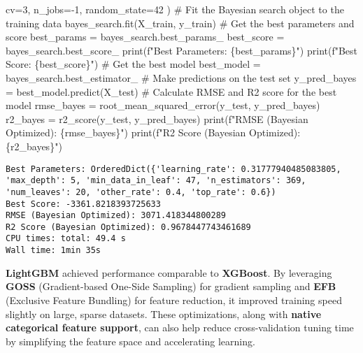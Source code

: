 \documentclass[
  letterpaper,
  DIV=11,
  numbers=noendperiod]{scrreprt}
\newenvironment{Shaded}{\begin{snugshade}}{\end{snugshade}}
\newcommand{\BuiltInTok}[1]{\textcolor[rgb]{0.00,0.23,0.31}{#1}}
\newcommand{\CommentTok}[1]{\textcolor[rgb]{0.37,0.37,0.37}{#1}}
\newcommand{\DecValTok}[1]{\textcolor[rgb]{0.68,0.00,0.00}{#1}}
\newcommand{\NormalTok}[1]{\textcolor[rgb]{0.00,0.23,0.31}{#1}}
\newcommand{\OperatorTok}[1]{\textcolor[rgb]{0.37,0.37,0.37}{#1}}
\newcommand{\SpecialCharTok}[1]{\textcolor[rgb]{0.37,0.37,0.37}{#1}}
\newcommand{\SpecialStringTok}[1]{\textcolor[rgb]{0.13,0.47,0.30}{#1}}
\begin{document}
\begin{Shaded}
\begin{Highlighting}[]
\NormalTok{    cv}\OperatorTok{=}\DecValTok{3}\NormalTok{,}
\NormalTok{    n\_jobs}\OperatorTok{={-}}\DecValTok{1}\NormalTok{,}
\NormalTok{    random\_state}\OperatorTok{=}\DecValTok{42}
\NormalTok{)}
\CommentTok{\# Fit the Bayesian search object to the training data}
\NormalTok{bayes\_search.fit(X\_train, y\_train)}
\CommentTok{\# Get the best parameters and score}
\NormalTok{best\_params }\OperatorTok{=}\NormalTok{ bayes\_search.best\_params\_}
\NormalTok{best\_score }\OperatorTok{=}\NormalTok{ bayes\_search.best\_score\_}
\BuiltInTok{print}\NormalTok{(}\SpecialStringTok{f"Best Parameters: }\SpecialCharTok{\{}\NormalTok{best\_params}\SpecialCharTok{\}}\SpecialStringTok{"}\NormalTok{)}
\BuiltInTok{print}\NormalTok{(}\SpecialStringTok{f"Best Score: }\SpecialCharTok{\{}\NormalTok{best\_score}\SpecialCharTok{\}}\SpecialStringTok{"}\NormalTok{)}
\CommentTok{\# Get the best model}
\NormalTok{best\_model }\OperatorTok{=}\NormalTok{ bayes\_search.best\_estimator\_}
\CommentTok{\# Make predictions on the test set}
\NormalTok{y\_pred\_bayes }\OperatorTok{=}\NormalTok{ best\_model.predict(X\_test)}
\CommentTok{\# Calculate RMSE and R2 score for the best model}
\NormalTok{rmse\_bayes }\OperatorTok{=}\NormalTok{ root\_mean\_squared\_error(y\_test, y\_pred\_bayes)}
\NormalTok{r2\_bayes }\OperatorTok{=}\NormalTok{ r2\_score(y\_test, y\_pred\_bayes)}
\BuiltInTok{print}\NormalTok{(}\SpecialStringTok{f"RMSE (Bayesian Optimized): }\SpecialCharTok{\{}\NormalTok{rmse\_bayes}\SpecialCharTok{\}}\SpecialStringTok{"}\NormalTok{)}
\BuiltInTok{print}\NormalTok{(}\SpecialStringTok{f"R2 Score (Bayesian Optimized): }\SpecialCharTok{\{}\NormalTok{r2\_bayes}\SpecialCharTok{\}}\SpecialStringTok{"}\NormalTok{)}
\end{Highlighting}
\end{Shaded}

\begin{verbatim}
Best Parameters: OrderedDict({'learning_rate': 0.31777940485083805, 'max_depth': 5, 'min_data_in_leaf': 47, 'n_estimators': 369, 'num_leaves': 20, 'other_rate': 0.4, 'top_rate': 0.6})
Best Score: -3361.8218393725633
RMSE (Bayesian Optimized): 3071.418344800289
R2 Score (Bayesian Optimized): 0.9678447743461689
CPU times: total: 49.4 s
Wall time: 1min 35s
\end{verbatim}

\textbf{LightGBM} achieved performance comparable to \textbf{XGBoost}.
By leveraging \textbf{GOSS} (Gradient-based One-Side Sampling) for
gradient sampling and \textbf{EFB} (Exclusive Feature Bundling) for
feature reduction, it improved training speed slightly on large, sparse
datasets. These optimizations, along with \textbf{native categorical
feature support}, can also help reduce cross-validation tuning time by
simplifying the feature space and accelerating learning.
\end{document}
